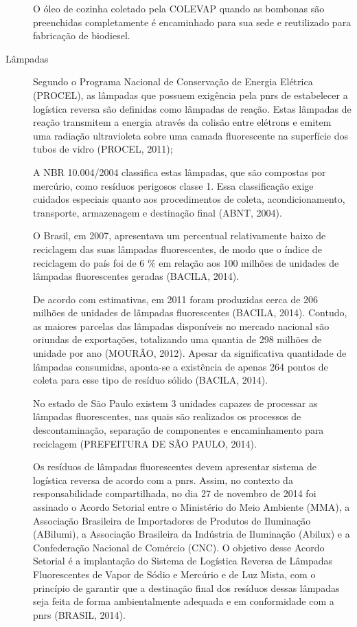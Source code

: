 \begin{description}
	O óleo de cozinha coletado pela COLEVAP quando as bombonas são preenchidas completamente é encaminhado para sua sede e reutilizado para fabricação de biodiesel.
	
	
	\item[Lâmpadas] Segundo o Programa Nacional de Conservação de Energia Elétrica (PROCEL), as lâmpadas que possuem exigência pela \gls{pnrs} de estabelecer a logística reversa são definidas como lâmpadas de reação. Estas lâmpadas de reação transmitem a energia através da colisão entre elétrons e emitem uma radiação ultravioleta sobre uma camada fluorescente na superfície dos tubos de vidro (PROCEL, 2011);
	
	A NBR 10.004/2004 classifica estas lâmpadas, que são compostas por mercúrio, como resíduos perigosos classe 1. Essa classificação exige cuidados especiais quanto aos procedimentos de coleta, acondicionamento, transporte, armazenagem e destinação final (ABNT, 2004).
	
	O Brasil, em 2007, apresentava um percentual relativamente baixo de reciclagem das suas lâmpadas fluorescentes, de modo que o índice de reciclagem do país foi de 6 \% em relação aos 100 milhões de unidades de lâmpadas fluorescentes geradas (BACILA, 2014).
	
	De acordo com estimativas, em 2011 foram produzidas cerca de 206 milhões de unidades de lâmpadas fluorescentes (BACILA, 2014). Contudo, as maiores parcelas das lâmpadas disponíveis no mercado nacional são oriundas de exportações, totalizando uma quantia de 298 milhões de unidade por ano (MOURÃO, 2012).
	Apesar da significativa quantidade de lâmpadas consumidas, aponta-se a existência de apenas 264 pontos de coleta para esse tipo de resíduo sólido (BACILA, 2014).
	
	No estado de São Paulo existem 3 unidades capazes de processar as lâmpadas fluorescentes, nas quais são realizados os processos de descontaminação, separação de componentes e encaminhamento para reciclagem (PREFEITURA DE SÃO PAULO, 2014).
	
	Os resíduos de lâmpadas fluorescentes devem apresentar sistema de logística reversa de acordo com a \gls{pnrs}. Assim, no contexto da responsabilidade compartilhada, no dia 27 de novembro de 2014 foi assinado o Acordo Setorial entre o Ministério do Meio Ambiente (MMA), a Associação Brasileira de Importadores de Produtos de Iluminação (ABilumi), a Associação Brasileira da Indústria de Iluminação (Abilux) e a Confederação Nacional de Comércio (CNC). O objetivo desse Acordo Setorial é a implantação do Sistema de Logística Reversa de Lâmpadas Fluorescentes de Vapor de Sódio e Mercúrio e de Luz Mista, com o princípio de garantir que a destinação final dos resíduos dessas lâmpadas seja feita de forma ambientalmente adequada e em conformidade com a \gls{pnrs} (BRASIL, 2014).
	

\end{description}
